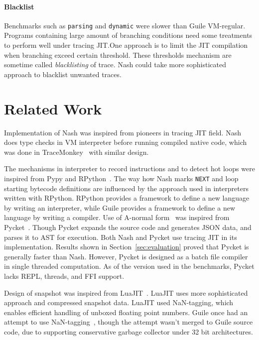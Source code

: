 \documentclass[preprint, 10pt]{sigplanconf}
\begin{document}
\paragraph{Blacklist} Benchmarks such as \texttt{parsing} and
\texttt{dynamic} were slower than Guile VM-regular. Programs containing large
amount of branching conditions need some treatments to perform well under
tracing JIT.\@ One approach is to limit the JIT compilation when branching
exceed certain threshold. These thresholds mechanism are sometime called
\textit{blacklisting} of trace. Nash could take more sophisticated approach to
blacklist unwanted traces.

\section{Related Work}
\label{sec:related}
Implementation of Nash was inspired from pioneers in tracing JIT field. Nash
does type checks in VM interpreter before running compiled native code, which
was done in TraceMonkey~\cite{gal2009trace} with similar design.

The mechanisms in interpreter to record instructions and to detect hot loops
were inspired from Pypy and RPython~\cite{bolz2009tracing}. The way how Nash
marks \texttt{NEXT} and loop starting bytecode definitions are influenced by
the approach used in interpreters written with RPython.  RPython provides a
framework to define a new language by writing an interpreter, while Guile
provides a framework to define a new language by writing a compiler.  Use of
A-normal form~\cite{flanagan1993essence} was inspired from
Pycket~\cite{bauman2015pycket}. Though Pycket expands the source code and
generates JSON data, and parses it to AST for execution. Both Nash and Pycket
use tracing JIT in its implementation. Results shown in
Section~\ref{sec:evaluation} proved that Pycket is generally faster than Nash.
However, Pycket is designed as a batch file compiler in single threaded
computation. As of the version used in the benchmarks, Pycket lacks REPL,
threads, and FFI support.

Design of snapshot was inspired from LuaJIT~\cite{pall2009ip}. LuaJIT uses
more sophisticated approach and compressed snapshot data. LuaJIT used
NaN-tagging, which enables efficient handling of unboxed floating point
numbers. Guile once had an attempt to use NaN-tagging~\cite{wingo2011value},
though the attempt wasn't merged to Guile source code, due to supporting
conservative garbage collector under 32 bit architectures.
\end{document}

